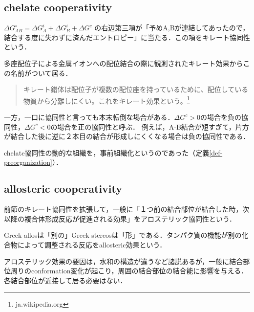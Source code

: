 \documentclass[uplatex, dvipdfmx]{jsreport}
\begin{document}
\subsection{chelate cooperativity}

\begin{definition}
    $\Delta G_{AB}^\circ = \Delta G^i_A+\Delta G^i_B + \Delta G^c$
の右辺第三項が「予めA,Bが連結してあったので，結合する度に失わずに済んだエントロピー」に当たる．この項をキレート協同性という．
\end{definition}
\begin{remark}
    多座配位子による金属イオンへの配位結合の際に観測されたキレート効果からこの名前がついて居る．
    \begin{quote}
        キレート錯体は配位子が複数の配位座を持っているために、配位している物質から分離しにくい。これをキレート効果という。\footnote{ja.wikipedia.org}
    \end{quote}
\end{remark}
\begin{remark}
    一方，一口に協同性と言っても本末転倒な場合がある．$\Delta G^c>0$の場合を負の協同性，$\Delta G^c<0$の場合を正の協同性と呼ぶ．
    例えば，A-B結合が短すぎて，片方が結合した後に逆に２本目の結合が形成しにくくなる場合は負の協同性である．
\end{remark}
\begin{remark}
    chelate協同性の動的な組織を，事前組織化というのであった（定義\ref{def-preorganization}）．
\end{remark}

\subsection{allosteric cooperativity}

\begin{definition}
    前節のキレート協同性を拡張して，一般に「１つ前の結合部位が結合した時，次以降の複合体形成反応が促進される効果」をアロステリック協同性という．
\end{definition}
\begin{remark}
    Greek allosは「別の」Greek stereosは「形」である．タンパク質の機能が別の化合物によって調整される反応をallosteric効果という．
\end{remark}
\begin{remark}
    アロステリック効果の要因は，水和の構造が違うなど諸説あるが，一般に結合部位周りのconformation変化が起こり，周囲の結合部位の結合能に影響を与える．各結合部位が近接して居る必要はない．
\end{remark}
\end{document}
